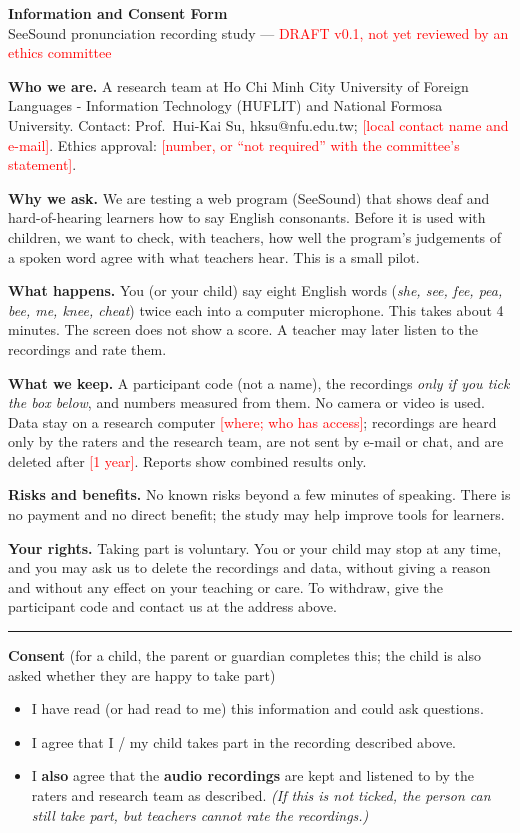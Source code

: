 \documentclass[11pt,a4paper]{article}
\newcommand{\tbd}[1]{\textcolor{red}{[#1]}}
\begin{document}
\begin{center}{\Large\bfseries Information and Consent Form}\\[2pt]
SeeSound pronunciation recording study --- \textcolor{red}{DRAFT v0.1, not yet reviewed by an ethics committee}\end{center}

\textbf{Who we are.} A research team at Ho Chi Minh City University of Foreign Languages - Information Technology (HUFLIT) and National Formosa University. Contact: Prof.\ Hui-Kai Su, hksu@nfu.edu.tw; \tbd{local contact name and e-mail}. Ethics approval: \tbd{number, or ``not required'' with the committee's statement}.

\textbf{Why we ask.} We are testing a web program (SeeSound) that shows deaf and hard-of-hearing learners how to say English consonants. Before it is used with children, we want to check, with teachers, how well the program's judgements of a spoken word agree with what teachers hear. This is a small pilot.

\textbf{What happens.} You (or your child) say eight English words (\textit{she, see, fee, pea, bee, me, knee, cheat}) twice each into a computer microphone. This takes about 4 minutes. The screen does not show a score. A teacher may later listen to the recordings and rate them.

\textbf{What we keep.} A participant code (not a name), the recordings \emph{only if you tick the box below}, and numbers measured from them. No camera or video is used. Data stay on a research computer \tbd{where; who has access}; recordings are heard only by the raters and the research team, are not sent by e-mail or chat, and are deleted after \tbd{1 year}. Reports show combined results only.

\textbf{Risks and benefits.} No known risks beyond a few minutes of speaking. There is no payment and no direct benefit; the study may help improve tools for learners.

\textbf{Your rights.} Taking part is voluntary. You or your child may stop at any time, and you may ask us to delete the recordings and data, without giving a reason and without any effect on your teaching or care. To withdraw, give the participant code and contact us at the address above.

\medskip\hrule\medskip
\textbf{Consent} (for a child, the parent or guardian completes this; the child is also asked whether they are happy to take part)

\begin{itemize}[label=$\square$]
\item I have read (or had read to me) this information and could ask questions.
\item I agree that I / my child takes part in the recording described above.
\item I \textbf{also} agree that the \textbf{audio recordings} are kept and listened to by the raters and research team as described. \textit{(If this is not ticked, the person can still take part, but teachers cannot rate the recordings.)}
\end{itemize}
\end{document}
